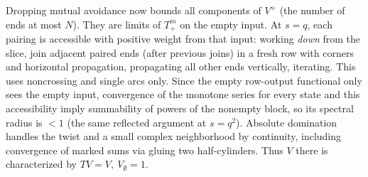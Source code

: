 Dropping mutual avoidance now bounds all components of \(V^+\) (the number of ends at most \(N\)). They are limits of \(T_+^m\) on the empty input. At \(s=q\), each pairing is accessible with positive weight from that input: working \emph{down} from the slice, join adjacent paired ends (after previous joins) in a fresh row with corners and horizontal propagation, propagating all other ends vertically, iterating. This uses noncrossing and single arcs only. Since the empty row-output functional only sees the empty input, convergence of the monotone series for every state and this accessibility imply summability of powers of the nonempty block, so its spectral radius is \(<1\) (the same reflected argument at \(s=q^2\)). Absolute domination handles the twist and a small complex neighborhood by continuity, including convergence of marked sums via gluing two half-cylinders. Thus \(V\) there is characterized by \(T V=V,\ V_\emptyset=1\).

